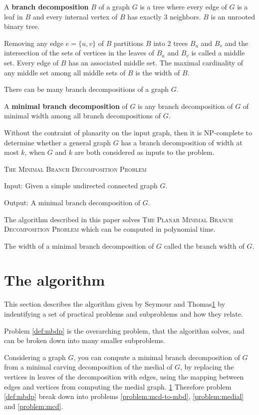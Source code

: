 \documentclass{article}
\begin{document}
	A \textbf{branch decomposition} $B$ of a graph $G$ is a tree where every edge of $G$ is a leaf in $B$ and every internal vertex of $B$ has exactly 3 neighbors. $B$ is an unrooted binary tree.

	Removing any edge $e = \{u,v\}$ of $B$ partitions $B$ into 2 trees $B_u$ and $B_v$ and the intersection of the sets of vertices in the leaves of $B_u$ and $B_v$ is called a middle set. Every edge of $B$ has an associated middle set. The maximal cardinality of any middle set among all middle sets of $B$ is the width of $B$.

	There can be many branch decompositions of a graph $G$.

	A \textbf{minimal branch decomposition} of $G$ is any branch decomposition of $G$ of minimal width among all branch decompositions of $G$.

	Without the contraint of planarity on the input graph, then it is NP-complete to determine whether a general graph $G$ has a branch decomposition of width at most $k$, when $G$ and $k$ are both considered as inputs to the problem.

	\begin{definition}\label{def:mbdp}
		\textsc{The Minimal Branch Decomposition Problem}

		Input: Given a simple undirected connected graph $G$.

		Output: A minimal branch decomposition of $G$.
	\end{definition}

	The algorithm described in this paper solves \textsc{The Planar Minimal Branch Decomposition Problem} which can be computed in polynomial time.

	The width of a minimal branch decomposition of $G$ called the branch width of $G$.

\section{The algorithm}
	This section describes the algorithm given by Seymour and Thomas\ref{} by indentifying a set of practical problems and subproblems and how they relate.
	
	Problem \ref{def:mbdp} is the overarching problem, that the algorithm solves, and can be broken down into many smaller subproblems.

	Considering a graph $G$, you can compute a minimal branch decomposition of $G$ from a minimal carving decomposition of the medial of $G$, by replacing the vertices in leaves of the decomposition with edges, using the mapping between edges and vertices from computing the medial graph. \ref{} Therefore problem \ref{def:mbdp} break down into problems \ref{problem:mcd-to-mbd}, \ref{problem:medial} and \ref{problem:mcd}.
\end{document}
